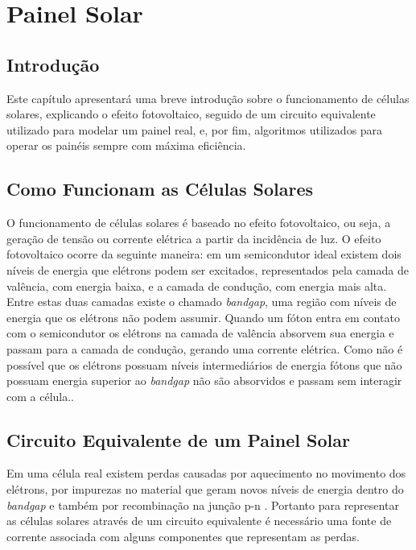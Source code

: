 \chapter{Painel Solar} \label{secao:painel solar}

\section{Introdução}

Este capítulo apresentará uma breve introdução sobre o funcionamento de células solares, explicando o efeito fotovoltaico, seguido de um circuito equivalente utilizado para modelar um painel real, e, por fim, algoritmos utilizados para operar os painéis sempre com máxima eficiência.

\section{Como Funcionam as Células Solares}

O funcionamento de células solares é baseado no efeito fotovoltaico, ou seja, a geração de tensão ou corrente elétrica a partir da incidência de luz. O efeito fotovoltaico ocorre da seguinte maneira: em um semicondutor ideal existem dois níveis de energia que elétrons podem ser excitados, representados pela camada de valência, com energia baixa, e a camada de condução, com energia mais alta. Entre estas duas camadas existe o chamado \textit{bandgap}, uma região com níveis de energia que os elétrons não podem assumir. Quando um fóton entra em contato com o semicondutor os elétrons na camada de valência absorvem sua energia e passam para a camada de condução, gerando uma corrente elétrica. Como não é possível que os elétrons possuam níveis intermediários de energia fótons que não possuam energia superior ao \textit{bandgap} não são absorvidos e passam sem interagir com a célula.\cite{jager2014}.

\section{Circuito Equivalente de um Painel Solar}

Em uma célula real existem perdas causadas por aquecimento no movimento dos elétrons, por impurezas no material que geram novos níveis de energia dentro do \textit{bandgap} e também por recombinação na junção p-n \cite{blakers2013}. Portanto para representar as células solares através de um circuito equivalente é necessário uma fonte de corrente associada com alguns componentes que representam as perdas.

